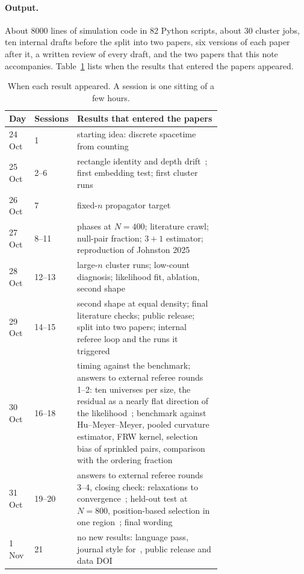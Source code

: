 \documentclass[11pt,a4paper]{article}
\begin{document}
\paragraph{Output.} About 8000 lines of simulation code in 82 Python scripts, about 30 cluster jobs, ten internal drafts before the split into two papers, six versions of each paper after it, a written review of every draft, and the two papers that this note accompanies. Table~\ref{tab:timeline} lists when the results that entered the papers appeared.

\begin{table}[h]
\centering\small
\begin{tabular}{@{}llp{0.7\linewidth}@{}}
\toprule
Day & Sessions & Results that entered the papers \\
\midrule
24 Oct & 1 & starting idea: discrete spacetime from counting \\
25 Oct & 2--6 & rectangle identity and depth drift~\cite{Toolkit}; first embedding test; first cluster runs \\
26 Oct & 7 & fixed-$n$ propagator target~\cite{Toolkit} \\
27 Oct & 8--11 & phases at $N=400$; literature crawl; null-pair fraction; $3+1$ estimator; reproduction of Johnston 2025~\cite{Embedding} \\
28 Oct & 12--13 & large-$n$ cluster runs; low-count diagnosis; likelihood fit, ablation, second shape~\cite{Embedding} \\
29 Oct & 14--15 & second shape at equal density; final literature checks; public release; split into two papers; internal referee loop and the runs it triggered \\
30 Oct & 16--18 & timing against the benchmark; answers to external referee rounds 1--2: ten universes per size, the residual as a nearly flat direction of the likelihood~\cite{Embedding}; benchmark against Hu--Meyer--Meyer, pooled curvature estimator, FRW kernel, selection bias of sprinkled pairs, comparison with the ordering fraction~\cite{Toolkit} \\
31 Oct & 19--20 & answers to external referee rounds 3--4, closing check: relaxations to convergence~\cite{Embedding}; held-out test at $N=800$, position-based selection in one region~\cite{Toolkit}; final wording \\
1 Nov & 21 & no new results: language pass, journal style for~\cite{Toolkit}, public release and data DOI \\
\bottomrule
\end{tabular}
\caption{When each result appeared. A session is one sitting of a few hours.}\label{tab:timeline}
\end{table}
\end{document}
